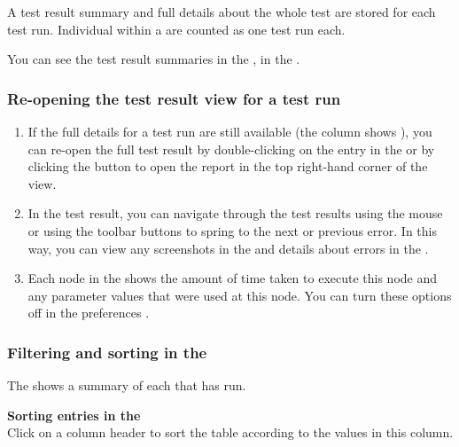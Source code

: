 A test result summary and full details about the whole test are stored for each test run. Individual \gdsuites{} within a \gdjob{} are counted as one test run each. 

You can see the test result summaries in the \reportpersp{}, in the \gdtestsummaryview{}. 

\subsubsection{Re-opening the test result view for a test run}
\label{TasksReopenTestResult}
\begin{enumerate}
\item If the full details for a test run are still available (the column  shows ), you can re-open the full test result by double-clicking on the entry in the \gdtestsummaryview{} or by clicking the button to open the report in the top right-hand corner of the view. 
\item In the test result, you can navigate through the test results using the mouse or using the toolbar buttons to spring to the next or previous error. In this way, you can view any screenshots in the \gdimgview{} and details about errors in the \gdpropview{}.
\item Each node in the \gdtestresultview{} shows the amount of time taken to execute this node and any parameter values that were used at this node. You can turn these options off in the preferences .
\end{enumerate}

\subsubsection{Filtering and sorting in the \gdtestsummaryview{}}
\label{TasksFilterTestSummary}

The \gdtestsummaryview{} shows a summary of each \gdsuite{} that has run. 

\textbf{Sorting entries in the \gdtestsummaryview}\\

Click on a column header to sort the table according to the values in this column. 

